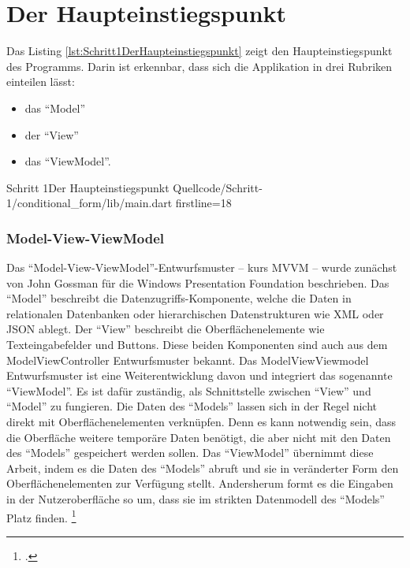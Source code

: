 

\section{Der Haupteinstiegspunkt}

Das Listing \ref{lst:Schritt1DerHaupteinstiegspunkt} zeigt den Haupteinstiegspunkt des Programms.
Darin ist erkennbar, dass sich die Applikation in drei Rubriken einteilen lässt:
\begin{itemize}
  \item das \enquote{Model} 
  \item der \enquote{View} 
  \item das \enquote{ViewModel}. 
\end{itemize}

\begin{alexlisting}{Schritt 1}{Der Haupteinstiegspunkt}
  {Quellcode/Schritt-1/conditional_form/lib/main.dart}
  {firstline=18}
  \label{lst:Schritt1DerHaupteinstiegspunkt}
\end{alexlisting}

\subsubsection{Model-View-ViewModel}
Das \enquote{Model-View-ViewModel}-Entwurfsmuster -- kurs MVVM -- wurde zunächst von John Gossman für die Windows Presentation Foundation beschrieben.
Das \enquote{Model} beschreibt die Datenzugriffs-Komponente, welche die Daten in relationalen Datenbanken oder hierarchischen Datenstrukturen wie XML oder JSON ablegt.
Der \enquote{View} beschreibt die Oberflächenelemente wie Texteingabefelder und Buttons.
Diese beiden Komponenten sind auch aus dem ModelViewController Entwurfsmuster bekannt.
Das ModelViewViewmodel Entwurfsmuster ist eine Weiterentwicklung davon und integriert das sogenannte \enquote{ViewModel}.
Es ist dafür zuständig, als Schnittstelle zwischen \enquote{View} und \enquote{Model} zu fungieren.
Die Daten des \enquote{Models} lassen sich in der Regel nicht direkt mit Oberflächenelementen verknüpfen.
Denn es kann notwendig sein, dass die Oberfläche weitere temporäre Daten benötigt, die aber nicht mit den Daten des \enquote{Models} gespeichert werden sollen.
Das \enquote{ViewModel} übernimmt diese Arbeit, indem es die Daten des \enquote{Models} abruft und sie in veränderter Form den Oberflächenelementen zur Verfügung stellt.
Andersherum formt es die Eingaben in der Nutzeroberfläche so um, dass sie im strikten Datenmodell des \enquote{Models} Platz finden.
\footcite[Vgl.][]{IntroductionToModelViewViewModelPatternForBuildingWPFApps}

